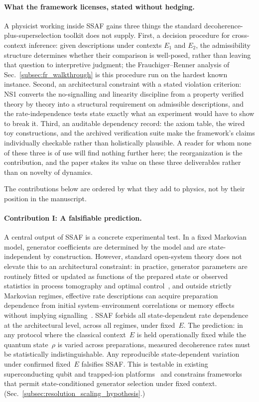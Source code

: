 \documentclass[aps,prx,onecolumn,11pt]{revtex4-2}
\theoremstyle{plain}
\theoremstyle{definition}
\theoremstyle{remark}
\begin{document}
\paragraph{What the framework licenses, stated without hedging.}
A physicist working inside SSAF gains three things the standard
decoherence-plus-superselection toolkit does not supply. First, a
decision procedure for cross-context inference: given descriptions
under contexts \(E_1\) and \(E_2\), the admissibility structure
determines whether their comparison is well-posed, rather than leaving
that question to interpretive judgment; the Frauchiger--Renner analysis
of Sec.~\ref{subsec:fr_walkthrough} is this procedure run on the
hardest known instance. Second, an architectural constraint with a
stated violation criterion: NS1 converts the no-signalling and
linearity discipline from a property verified theory by theory into a
structural requirement on admissible descriptions, and the
rate-independence tests state exactly what an experiment
would have to show to break it. Third, an auditable dependency record:
the axiom table, the wired toy constructions, and the archived
verification suite make the framework's claims individually checkable
rather than holistically plausible. A reader for whom none of these
three is of use will find nothing further here; the reorganization is
the contribution, and the paper stakes its value on these three
deliverables rather than on novelty of dynamics.

The contributions below are ordered by what they add to physics, not by their
position in the manuscript.

\paragraph{Contribution I: A falsifiable prediction.}
A central output of SSAF is a concrete experimental test. 
In a fixed Markovian model, generator coefficients are determined by the
model and are state-independent by construction. However, standard
open-system theory does not elevate this to an architectural constraint:
in practice, generator parameters are routinely fitted or updated as
functions of the prepared state or observed statistics in process
tomography and optimal control~\cite{Wiseman2009,DAlessandro2021}, and
outside strictly Markovian regimes, effective rate descriptions can
acquire preparation dependence from initial system--environment
correlations or memory effects without implying
signalling~\cite{Pechukas1994,Laine2010,Colla2022}. SSAF forbids all
state-dependent rate dependence at the architectural level, across all
regimes, under fixed~$E$. The prediction: in any protocol where the
classical context~$E$ is held operationally fixed while the quantum
state~$\rho$ is varied across preparations, measured decoherence rates
must be statistically indistinguishable. Any reproducible
state-dependent variation under confirmed fixed~$E$ falsifies SSAF.
This is testable in existing superconducting qubit and trapped-ion
platforms~\cite{Krantz2019,Bruzewicz2019} and constrains frameworks
that permit state-conditioned generator selection under fixed context.
(Sec.~\ref{subsec:resolution_scaling_hypothesis}.)
\end{document}

